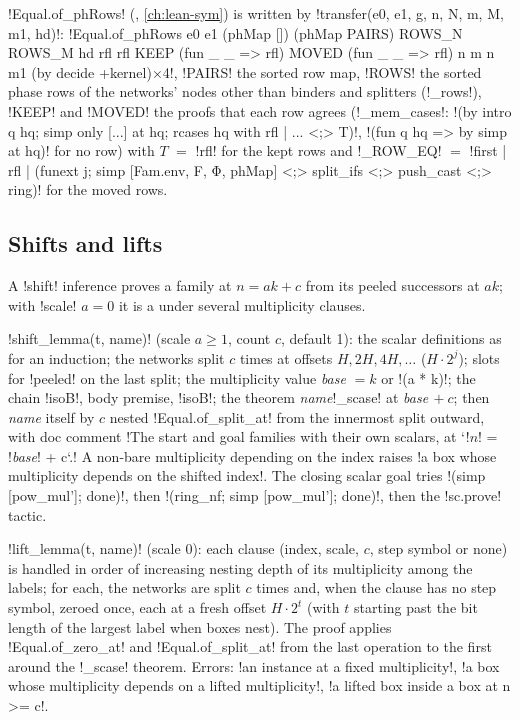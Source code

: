 {\lean!Equal.of_phRows! (, \cref{ch:lean-sym}) is written by
\py!transfer(e0, e1, g, n, N, m, M, m1, hd)!:
\code!Equal.of_phRows e0 e1 (phMap []) (phMap PAIRS) ROWS_N ROWS_M hd rfl rfl KEEP (fun _ _ => rfl) MOVED (fun _ _ => rfl) n m n m1 (by decide +kernel)×4!,
\code!PAIRS! the sorted row map, \code!ROWS! the sorted phase rows of the networks' nodes other
than binders and splitters (\py!_rows!), \code!KEEP! and \code!MOVED! the proofs that each row
agrees (\py!_mem_cases!: \code!(by intro q hq; simp only [...] at hq; rcases hq with rfl | ... <;> T)!,
\code!(fun q hq => by simp at hq)! for no row) with $T$ $=$ \code!rfl! for the kept rows and
\py!_ROW_EQ! $=$ \leanx!first | rfl | (funext j; simp [Fam.env, F, Φ, phMap] <;> split_ifs <;> push_cast <;> ring)!
for the moved rows.

\subsection{Shifts and lifts}\label{sec:lean-export-net-shift}

A \code!shift! inference proves a family at $n = a k + c$ from its peeled successors at
$a k$; with \code!scale! $a = 0$ it is a  under several multiplicity clauses.

\py!shift_lemma(t, name)! (scale $a\ge1$, count $c$, default 1): the scalar definitions as for an
induction; the networks split $c$ times at offsets $H, 2H, 4H, \dots$ ($H\cdot2^j$); slots for
\code!peeled! on the last split; the multiplicity value \textit{base} $=k$ or \code!(a * k)!; the
chain \lean!isoB!, body premise, \lean!isoB!; the theorem \textit{name}\code!_scase! at
\textit{base}$\,+c$; then \textit{name} itself by $c$ nested \lean!Equal.of_split_at! from the
innermost split outward, with doc comment
\code!The start and goal families with their own scalars, at `!$n$\code! = !\textit{base}\code! + c`.!
A non-bare multiplicity depending on the index raises
\code!a box whose multiplicity depends on the shifted index!. The closing scalar goal tries
\code!(simp [pow_mul']; done)!, then \code!(ring_nf; simp [pow_mul']; done)!, then the
\py!sc.prove! tactic.

\py!lift_lemma(t, name)! (scale 0): each clause (index, scale, $c$, step symbol or none) is
handled in order of increasing nesting depth of its multiplicity among the labels; for each, the
networks are split $c$ times and, when the clause has no step symbol, zeroed once, each at a fresh
offset $H\cdot2^{t}$ (with $t$ starting past the bit length of the largest label when boxes nest).
The proof applies \lean!Equal.of_zero_at! and \lean!Equal.of_split_at! from the last operation to
the first around the \code!_scase! theorem. Errors: \code!an instance at a fixed multiplicity!,
\code!a box whose multiplicity depends on a lifted multiplicity!,
\code!a lifted box inside a box at n >= c!.

}
